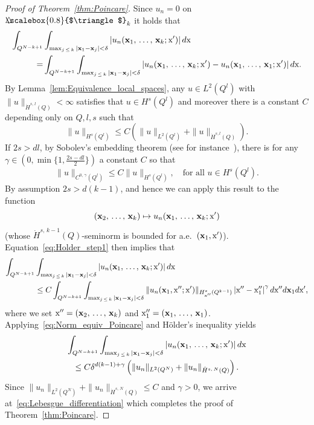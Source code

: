 \documentclass[10pt]{amsart}
\theoremstyle{definition}\newtheorem{defi}[theo]{Definition}\newtheorem{rema}[theo]{Remark}\newtheorem{exam}[theo]{Example}\newtheorem{exem}[theo]{Example}\newtheorem{nota}[theo]{Notation}
\newcommand\1{{\ensuremath {\mathds 1} }}
\newcommand{\bx}{\mathbf{x}}
\newcommand{\sx}{\textup{x}}
\newcommand{\bDelta}{{\mbox{$\triangle$}\hspace{-8.6pt}\scalebox{0.8}{$\triangle$}}}
\begin{document}
\begin{proof}[Proof of Theorem~\ref{thm:Poincare}]
Since $u_n=0$ on $\bDelta_k$ it holds that
\begin{equation}\label{eq:Holder_step1}
\begin{aligned}
\int_{Q^{N-k+1}}&\int_{\max_{j\,\leq\,k}|\bx_1-\bx_j|< \delta}|u_n(\bx_1,\,\ldots,\,\bx_k; \sx')| \,d\sx\\
=
&\int_{Q^{N-k+1}}\int_{\max_{j\,\leq\,k}|\bx_1-\bx_j|< \delta}|u_n(\bx_1,\,\ldots,\,\bx_k; \sx')-u_n(\bx_1,\, \ldots,\,\bx_1; \sx')| \,d\sx.
\end{aligned}
\end{equation}
By Lemma~\ref{lem:Equivalence_local_spaces}, any $u\in L^2(Q^{l})$ with $\|u\|_{\dot{H}^{s,\,l}(Q)}<\infty$ satisfies that $u\in H^s(Q^{l})$ and moreover there is a constant $C$ depending only on $Q, l, s$ such that
\begin{equation}\label{eq:Norm_equiv_Poincare}
\|u\|_{H^s(Q^{l})}\leq C\left(\|u\|_{L^2(Q^l)}+\|u\|_{\dot{H}^{s,l}(Q)}\right).
\end{equation}
If $2s>dl$, by Sobolev's embedding theorem (see for instance~\cite[Theorem~8.2]{Hitchhikers}), there is for any $\gamma\in (0, \min\{1, \tfrac{2s-dl}{2}\})$ a constant $C$ so that
\begin{equation*}
\|u\|_{C^{0,\,\gamma}(Q^l)}\leq C \|u\|_{H^s(Q^l)}, \quad \text{for all }u\in H^s\left(Q^l\right).
\end{equation*}
By assumption $2s>d(k-1)$, and hence we can apply this result to the function
\begin{equation*}
(\bx_2,\,\ldots,\,\bx_k)\mapsto u_n(\bx_1,\,\ldots,\, \bx_k; \sx')
\end{equation*}
(whose $\dot{H}^{s,\,k-1}(Q)$-seminorm is bounded for a.e.~$(\bx_1, \sx')$). Equation~\eqref{eq:Holder_step1} then implies that
\begin{align*}
\int_{Q^{N-k+1}}&\int_{\max_{j\,\leq\,k}|\bx_1-\bx_j|< \delta}|u_n(\bx_1,\,\ldots,\,\bx_k; \sx')| \,d\sx\\
&\leq C\int_{Q^{N-k+1}}\int_{\max_{j\,\leq\,k}|\bx_1-\bx_j|< \delta} \|u_n(\bx_1, \sx''; \sx')\|_{H^s_{\sx''}(Q^{k-1})}\left|\sx''-\sx''_1\right|^\gamma d\sx'' d\bx_1 d\sx',
\end{align*}
where we set $\sx''=(\bx_2,\,\ldots,\,\bx_k)$ and $\sx''_1=(\bx_1,\,\ldots,\,\bx_1)$. Applying~\eqref{eq:Norm_equiv_Poincare} and H\"older's inequality yields
\begin{multline*}
\int_{Q^{N-k+1}}\int_{\max_{j\,\leq\,k}|\bx_1-\bx_j|< \delta}|u_n(\bx_1,\,\ldots,\,\bx_k; \sx')| \,d\sx\\
\leq C\delta^{d(k-1)+\gamma}\left(\|u_n\|_{L^2(Q^N)}+\|u_n\|_{\dot{H}^{s,\,N}(Q)}\right).
\end{multline*}
Since $\|u_n\|_{L^2(Q^N)}+\|u_n\|_{\dot{H}^{s,\,N}(Q)}\leq C$ and $\gamma>0$, we arrive at~\eqref{eq:Lebesgue_differentiation} which completes the proof of Theorem~\ref{thm:Poincare}.
\end{proof}
\end{document}
